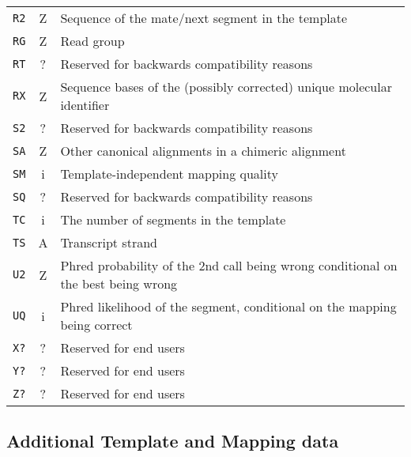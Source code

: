 \documentclass[10pt]{article}
\begin{document}
\begin{center}
\begin{longtable}{ccp{12.5cm}}
  {\tt R2} & Z & Sequence of the mate/next segment in the template \\
  {\tt RG} & Z & Read group \\
  {\tt RT} & ? & Reserved for backwards compatibility reasons \\
  {\tt RX} & Z & Sequence bases of the (possibly corrected) unique molecular identifier \\
  {\tt S2} & ? & Reserved for backwards compatibility reasons \\
  {\tt SA} & Z & Other canonical alignments in a chimeric alignment \\
  {\tt SM} & i & Template-independent mapping quality \\
  {\tt SQ} & ? & Reserved for backwards compatibility reasons \\
  {\tt TC} & i & The number of segments in the template \\
  {\tt TS} & A & Transcript strand \\
  {\tt U2} & Z & Phred probability of the 2nd call being wrong conditional on the best being wrong \\
  {\tt UQ} & i & Phred likelihood of the segment, conditional on the mapping being correct \\
  {\tt X?} & ? & Reserved for end users \\
  {\tt Y?} & ? & Reserved for end users \\
  {\tt Z?} & ? & Reserved for end users \\
  \hline
\end{longtable}
\end{center}

\subsection{Additional Template and Mapping data}
\end{document}
